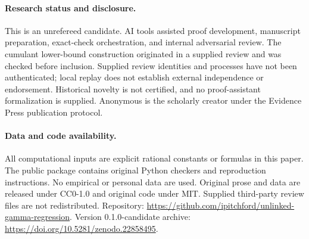 \documentclass[11pt]{article}
\theoremstyle{definition}\newtheorem{definition}[theorem]{Definition}
\theoremstyle{remark}\newtheorem{remark}[theorem]{Remark}
\begin{document}
\paragraph{Research status and disclosure.}
This is an unrefereed candidate. AI tools assisted proof development, manuscript preparation, exact-check orchestration, and internal adversarial review. The cumulant lower-bound construction originated in a supplied review and was checked before inclusion. Supplied review identities and processes have not been authenticated; local replay does not establish external independence or endorsement. Historical novelty is not certified, and no proof-assistant formalization is supplied. Anonymous is the scholarly creator under the Evidence Press publication protocol.

\paragraph{Data and code availability.}
All computational inputs are explicit rational constants or formulas in this paper. The public package contains original Python checkers and reproduction instructions. No empirical or personal data are used. Original prose and data are released under CC0-1.0 and original code under MIT. Supplied third-party review files are not redistributed. Repository: \url{https://github.com/ipitchford/unlinked-gamma-regression}. Version 0.1.0-candidate archive: \url{https://doi.org/10.5281/zenodo.22858495}.
\end{document}
